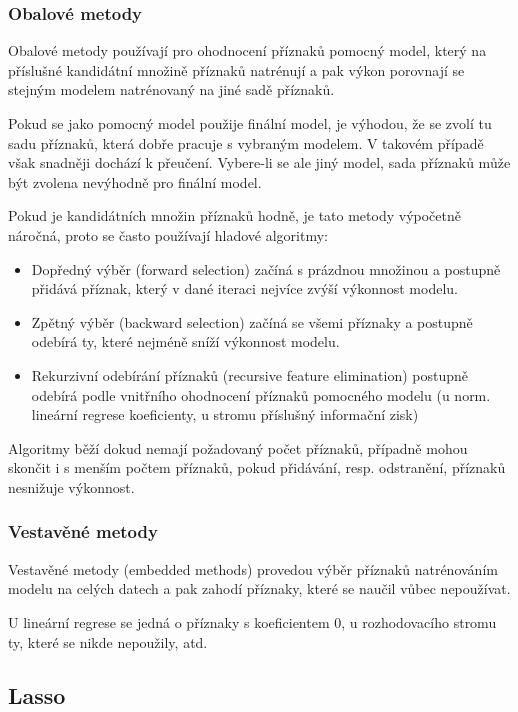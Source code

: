 \subsubsection{Obalové metody}

Obalové metody používají pro ohodnocení příznaků pomocný model, který na příslušné kandidátní množině příznaků natrénují a pak výkon porovnají se stejným modelem natrénovaný na jiné sadě příznaků.

Pokud se jako pomocný model použije finální model, je výhodou, že se zvolí tu sadu příznaků, která dobře pracuje s vybraným modelem. V takovém případě však snadněji dochází k přeučení. Vybere-li se ale jiný model, sada příznaků může být zvolena nevýhodně pro finální model.

Pokud je kandidátních množin příznaků hodně, je tato metody výpočetně náročná, proto se často používají hladové algoritmy:
\begin{itemize}

    \item Dopředný výběr (forward selection) začíná s prázdnou množinou a postupně přidává příznak, který v dané iteraci nejvíce zvýší výkonnost modelu.

    \item Zpětný výběr (backward selection) začíná se všemi příznaky a postupně odebírá ty, které nejméně sníží výkonnost modelu.

    \item Rekurzivní odebírání příznaků (recursive feature elimination) postupně odebírá podle vnitřního ohodnocení příznaků pomocného modelu (u norm. lineární regrese koeficienty, u stromu příslušný informační zisk)

\end{itemize}
Algoritmy běží dokud nemají požadovaný počet příznaků, případně mohou skončit i s menším počtem příznaků, pokud přidávání, resp. odstranění, příznaků nesnižuje výkonnost.

\subsubsection{Vestavěné metody}

Vestavěné metody (embedded methods) provedou výběr příznaků natrénováním modelu na celých datech a pak zahodí příznaky, které se naučil vůbec nepoužívat.

U lineární regrese se jedná o příznaky s koeficientem 0, u rozhodovacího stromu ty, které se nikde nepoužily, atd.

\subsection{Lasso} \label{sec:lasso}


